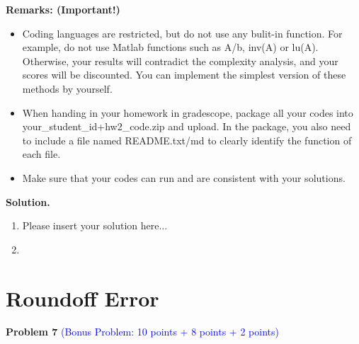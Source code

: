 \documentclass[english,onecolumn]{IEEEtran}
\begin{document}
\begin{enumerate}
\noindent\textbf{Remarks: (Important!)}
\begin{itemize}
    \item Coding languages are restricted, but do not use any bulit-in function. For example, do not use {\sf Matlab} functions such as {\sf A/b}, {\sf inv(A)} or {\sf lu(A)}. Otherwise, your results will contradict the complexity analysis, and your scores will be discounted. You can implement the simplest version of these methods by yourself.
    \item When handing in your homework in gradescope, package all your codes into {\sf your\_student\_id+hw2\_code.zip} and upload. In the package, you also need to include a file named {\sf README.txt/md} to clearly identify the function of each file.
     \item Make sure that your codes can run and are consistent with your solutions.
\end{itemize}
\end{enumerate} 

\noindent\textbf{Solution.}
\begin{enumerate}
    \item Please insert your solution here...
    \item 
\end{enumerate}

\newpage

\section{Roundoff Error}
\noindent\textbf{Problem 7} \textcolor{blue}{(Bonus Problem: 10 points + 8 points + 2 points)}
\end{document}
